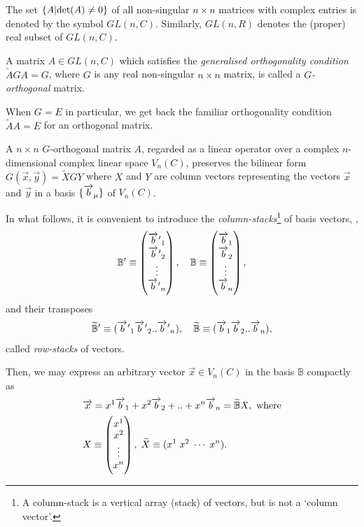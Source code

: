 \begin{small}
The set $\{A | \text{det}(A)\neq 0 \}$ of all non-singular 
$n\times n$ matrices with complex entries is denoted by the 
symbol $GL(n,C)$.  Similarly, $GL(n,R)$ denotes the 
(proper) 
real subset of $GL(n,C)$.

\dfn A matrix $A \in GL(n,C)$ which satisfies the 
\textsl{generalised orthogonality condition} $\tilde{A}GA=G 
$, where $G$ is any real non-singular $n\times n$ matrix, 
is called a \textsl{$G$-orthogonal} matrix. 

When  $G = E$ in particular, we get back the familiar 
orthogonality condition  $\tilde{A}A = E$ for an 
orthogonal matrix.

\lem A $n \times n$  $G$-orthogonal matrix  $A$, regarded 
as a linear operator over a complex  $n$-dimensional 
complex linear space $V_n(C)$, preserves the bilinear form 
$G(\vec{x},\vec{y}) = \tilde{X} G Y$ where  $X $ and  $Y$ 
are column vectors representing the vectors $\vec{x}$ and 
$\vec{y}$ in a basis $\{\overrightarrow{b}_{{\mu}}\}$ of $V_n(C)$.

In what follows, it is 
convenient to introduce the 
\textsl{column-stacks}\footnote{A column-stack is a 
vertical 
array (stack) of {vectors}, but is not a `column vector'.} 
of basis vectors, \ie,
\begin{align}\label{str.64}
\mathbb{B}'\equiv \begin{pmatrix}
 {\ensuremath{\overrightarrow{b}\hspace*{.3pt}'}}_1\\ {\overrightarrow{b}\hspace*{.3pt}'}_2\\ \vdots\\{\overrightarrow{b}\hspace*{.3pt}'}_n
\end{pmatrix},\quad
\mathbb{B}\equiv\begin{pmatrix}
 \overrightarrow{b}_1\\ \overrightarrow{b}_2\\ \vdots\\\overrightarrow{b}_n
\end{pmatrix},
\end{align}
and their transposes
\begin{align*}
\widetilde{\mathbb{B}}'\equiv
({\overrightarrow{b}\hspace*{.3pt}'}_1
{\overrightarrow{b}\hspace*{.3pt}'}_2.. {\overrightarrow{b}\hspace*{.3pt}'}_n) ,\quad\widetilde{\mathbb{B}}
\equiv (\overrightarrow{b}_1 \overrightarrow{b}_2.. \overrightarrow{b}_n),
\end{align*}
called \textsl{row-stacks} of {vectors}.

Then, we may express an arbitrary vector $\vec{x}\in V_n(C)$ 
in the basis $\mathbb{B}$ compactly as
\begin{align}\label{str.65}
&\overrightarrow{x}=x^1\overrightarrow{b}_1+x^2\overrightarrow{b}_2 + ..
+x^n\overrightarrow{b}_n=\widetilde{\mathbb{B}}X,\text{ where} \notag\\
& X\equiv
\begin{pmatrix}
 x^1\\ x^2\\\vdots\\x^n
\end{pmatrix}, \;
\widetilde{X}\equiv (x^1 \; x^2 \;   \cdots \;  x^n).
\end{align}


\end{small}
